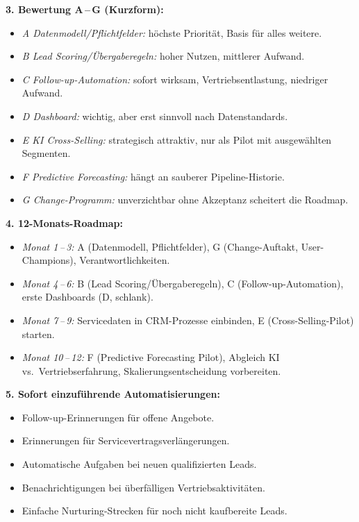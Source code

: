 \documentclass[11pt,a4paper,oneside]{article}
\begin{document}
\begin{loesungbox}
\textbf{3. Bewertung A\,--\,G (Kurzform):}
\begin{itemize}
  \item \emph{A \textendash{} Datenmodell/Pflichtfelder:} höchste Priorität, Basis für alles weitere.
  \item \emph{B \textendash{} Lead Scoring/Übergaberegeln:} hoher Nutzen, mittlerer Aufwand.
  \item \emph{C \textendash{} Follow-up-Automation:} sofort wirksam, Vertriebsentlastung, niedriger Aufwand.
  \item \emph{D \textendash{} Dashboard:} wichtig, aber erst sinnvoll nach Datenstandards.
  \item \emph{E \textendash{} KI Cross-Selling:} strategisch attraktiv, nur als Pilot mit ausgewählten Segmenten.
  \item \emph{F \textendash{} Predictive Forecasting:} hängt an sauberer Pipeline-Historie.
  \item \emph{G \textendash{} Change-Programm:} unverzichtbar \textendash{} ohne Akzeptanz scheitert die Roadmap.
\end{itemize}

\textbf{4. 12-Monats-Roadmap:}
\begin{itemize}
  \item \emph{Monat 1\,--\,3:} A (Datenmodell, Pflichtfelder), G (Change-Auftakt, User-Champions), Verantwortlichkeiten.
  \item \emph{Monat 4\,--\,6:} B (Lead Scoring/Übergaberegeln), C (Follow-up-Automation), erste Dashboards (D, schlank).
  \item \emph{Monat 7\,--\,9:} Servicedaten in CRM-Prozesse einbinden, E (Cross-Selling-Pilot) starten.
  \item \emph{Monat 10\,--\,12:} F (Predictive Forecasting Pilot), Abgleich KI vs.\ Vertriebserfahrung, Skalierungsentscheidung vorbereiten.
\end{itemize}

\textbf{5. Sofort einzuführende Automatisierungen:}
\begin{itemize}
  \item Follow-up-Erinnerungen für offene Angebote.
  \item Erinnerungen für Servicevertragsverlängerungen.
  \item Automatische Aufgaben bei neuen qualifizierten Leads.
  \item Benachrichtigungen bei überfälligen Vertriebsaktivitäten.
  \item Einfache Nurturing-Strecken für noch nicht kaufbereite Leads.
\end{itemize}


\end{loesungbox}
\end{document}
